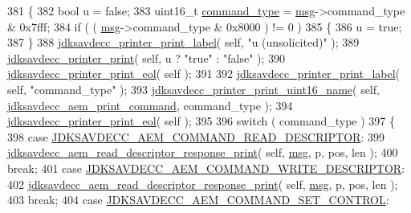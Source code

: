 \begin{DoxyCode}
381 \{
382     \textcolor{keywordtype}{bool} u = \textcolor{keyword}{false};
383     uint16\_t \hyperlink{structjdksavdecc__aecpdu__aem_a07f7ee802870e9ae75f021832f59a8a9}{command\_type} = \hyperlink{maap__log__linux_8c_a0c7e58a50354c4a4d6dad428d0e47029}{msg}->command\_type & 0x7fff;
384     \textcolor{keywordflow}{if} ( ( \hyperlink{maap__log__linux_8c_a0c7e58a50354c4a4d6dad428d0e47029}{msg}->command\_type & 0x8000 ) != 0 )
385     \{
386         u = \textcolor{keyword}{true};
387     \}
388     \hyperlink{group__util_gaf7818b24143b3c7502926a425a242ff5}{jdksavdecc\_printer\_print\_label}( \textcolor{keyword}{self}, \textcolor{stringliteral}{"u (unsolicited)"} );
389     \hyperlink{group__util_ga335ac75e0aa3fe66501b752bf9d0f90d}{jdksavdecc\_printer\_print}( \textcolor{keyword}{self}, u ? \textcolor{stringliteral}{"true"} : \textcolor{stringliteral}{"false"} );
390     \hyperlink{group__util_gacda56c9d3d24593a52c999682fa6e6e3}{jdksavdecc\_printer\_print\_eol}( \textcolor{keyword}{self} );
391 
392     \hyperlink{group__util_gaf7818b24143b3c7502926a425a242ff5}{jdksavdecc\_printer\_print\_label}( \textcolor{keyword}{self}, \textcolor{stringliteral}{"command\_type"} );
393     \hyperlink{group__util_ga62486d864a66773d19bbbe23cebf346a}{jdksavdecc\_printer\_print\_uint16\_name}( \textcolor{keyword}{self}, 
      \hyperlink{group__aem__print_gae7bba26850c31fa12c46c66161513148}{jdksavdecc\_aem\_print\_command}, command\_type );
394     \hyperlink{group__util_gacda56c9d3d24593a52c999682fa6e6e3}{jdksavdecc\_printer\_print\_eol}( \textcolor{keyword}{self} );
395 
396     \textcolor{keywordflow}{switch} ( command\_type )
397     \{
398     \textcolor{keywordflow}{case} \hyperlink{group__command_gaa6a32a290cbec71466b571590b05fd00}{JDKSAVDECC\_AEM\_COMMAND\_READ\_DESCRIPTOR}:
399         \hyperlink{group__aem__print_gaa565b25028b932889c102445b2ae7c52}{jdksavdecc\_aem\_read\_descriptor\_response\_print}( \textcolor{keyword}{self}, 
      \hyperlink{maap__log__linux_8c_a0c7e58a50354c4a4d6dad428d0e47029}{msg}, p, pos, len );
400         \textcolor{keywordflow}{break};
401     \textcolor{keywordflow}{case} \hyperlink{group__command_ga2042c293682f0eb1b948a7be2967f3cb}{JDKSAVDECC\_AEM\_COMMAND\_WRITE\_DESCRIPTOR}:
402         \hyperlink{group__aem__print_gaa565b25028b932889c102445b2ae7c52}{jdksavdecc\_aem\_read\_descriptor\_response\_print}( \textcolor{keyword}{self}, 
      \hyperlink{maap__log__linux_8c_a0c7e58a50354c4a4d6dad428d0e47029}{msg}, p, pos, len );
403         \textcolor{keywordflow}{break};
404     \textcolor{keywordflow}{case} \hyperlink{group__command_ga78648020206806d2992e010573f0ef27}{JDKSAVDECC\_AEM\_COMMAND\_SET\_CONTROL}:

\end{DoxyCode}
